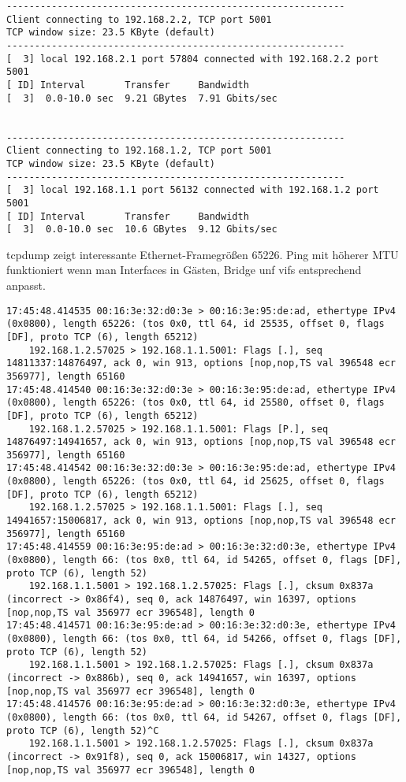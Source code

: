 \setupVerbatimOut
\begin{verbatim}
------------------------------------------------------------
Client connecting to 192.168.2.2, TCP port 5001
TCP window size: 23.5 KByte (default)
------------------------------------------------------------
[  3] local 192.168.2.1 port 57804 connected with 192.168.2.2 port 5001
[ ID] Interval       Transfer     Bandwidth
[  3]  0.0-10.0 sec  9.21 GBytes  7.91 Gbits/sec


------------------------------------------------------------
Client connecting to 192.168.1.2, TCP port 5001
TCP window size: 23.5 KByte (default)
------------------------------------------------------------
[  3] local 192.168.1.1 port 56132 connected with 192.168.1.2 port 5001
[ ID] Interval       Transfer     Bandwidth
[  3]  0.0-10.0 sec  10.6 GBytes  9.12 Gbits/sec
\end{verbatim}
tcpdump zeigt interessante Ethernet-Framegrößen 65226. Ping mit höherer MTU funktioniert wenn man Interfaces in Gästen, Bridge unf vifs entsprechend anpasst.
\setupVerbatimOut
\begin{verbatim}
17:45:48.414535 00:16:3e:32:d0:3e > 00:16:3e:95:de:ad, ethertype IPv4 (0x0800), length 65226: (tos 0x0, ttl 64, id 25535, offset 0, flags [DF], proto TCP (6), length 65212)
    192.168.1.2.57025 > 192.168.1.1.5001: Flags [.], seq 14811337:14876497, ack 0, win 913, options [nop,nop,TS val 396548 ecr 356977], length 65160
17:45:48.414540 00:16:3e:32:d0:3e > 00:16:3e:95:de:ad, ethertype IPv4 (0x0800), length 65226: (tos 0x0, ttl 64, id 25580, offset 0, flags [DF], proto TCP (6), length 65212)
    192.168.1.2.57025 > 192.168.1.1.5001: Flags [P.], seq 14876497:14941657, ack 0, win 913, options [nop,nop,TS val 396548 ecr 356977], length 65160
17:45:48.414542 00:16:3e:32:d0:3e > 00:16:3e:95:de:ad, ethertype IPv4 (0x0800), length 65226: (tos 0x0, ttl 64, id 25625, offset 0, flags [DF], proto TCP (6), length 65212)
    192.168.1.2.57025 > 192.168.1.1.5001: Flags [.], seq 14941657:15006817, ack 0, win 913, options [nop,nop,TS val 396548 ecr 356977], length 65160
17:45:48.414559 00:16:3e:95:de:ad > 00:16:3e:32:d0:3e, ethertype IPv4 (0x0800), length 66: (tos 0x0, ttl 64, id 54265, offset 0, flags [DF], proto TCP (6), length 52)
    192.168.1.1.5001 > 192.168.1.2.57025: Flags [.], cksum 0x837a (incorrect -> 0x86f4), seq 0, ack 14876497, win 16397, options [nop,nop,TS val 356977 ecr 396548], length 0
17:45:48.414571 00:16:3e:95:de:ad > 00:16:3e:32:d0:3e, ethertype IPv4 (0x0800), length 66: (tos 0x0, ttl 64, id 54266, offset 0, flags [DF], proto TCP (6), length 52)
    192.168.1.1.5001 > 192.168.1.2.57025: Flags [.], cksum 0x837a (incorrect -> 0x886b), seq 0, ack 14941657, win 16397, options [nop,nop,TS val 356977 ecr 396548], length 0
17:45:48.414576 00:16:3e:95:de:ad > 00:16:3e:32:d0:3e, ethertype IPv4 (0x0800), length 66: (tos 0x0, ttl 64, id 54267, offset 0, flags [DF], proto TCP (6), length 52)^C
    192.168.1.1.5001 > 192.168.1.2.57025: Flags [.], cksum 0x837a (incorrect -> 0x91f8), seq 0, ack 15006817, win 14327, options [nop,nop,TS val 356977 ecr 396548], length 0
\end{verbatim}

